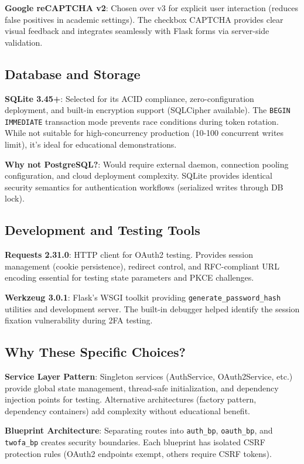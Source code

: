 \documentclass[12pt,a4paper]{article}
\begin{document}
\textbf{Google reCAPTCHA v2}: Chosen over v3 for explicit user interaction (reduces false positives in academic settings). The checkbox CAPTCHA provides clear visual feedback and integrates seamlessly with Flask forms via server-side validation.

\subsection{Database and Storage}

\textbf{SQLite 3.45+}: Selected for its ACID compliance, zero-configuration deployment, and built-in encryption support (SQLCipher available). The \texttt{BEGIN IMMEDIATE} transaction mode prevents race conditions during token rotation. While not suitable for high-concurrency production (10-100 concurrent writes limit), it's ideal for educational demonstrations.

\textbf{Why not PostgreSQL?}: Would require external daemon, connection pooling configuration, and cloud deployment complexity. SQLite provides identical security semantics for authentication workflows (serialized writes through DB lock).

\subsection{Development and Testing Tools}

\textbf{Requests 2.31.0}: HTTP client for OAuth2 testing. Provides session management (cookie persistence), redirect control, and RFC-compliant URL encoding essential for testing state parameters and PKCE challenges.

\textbf{Werkzeug 3.0.1}: Flask's WSGI toolkit providing \texttt{generate\_password\_hash} utilities and development server. The built-in debugger helped identify the session fixation vulnerability during 2FA testing.

\subsection{Why These Specific Choices?}

\textbf{Service Layer Pattern}: Singleton services (AuthService, OAuth2Service, etc.) provide global state management, thread-safe initialization, and dependency injection points for testing. Alternative architectures (factory pattern, dependency containers) add complexity without educational benefit.

\textbf{Blueprint Architecture}: Separating routes into \texttt{auth\_bp}, \texttt{oauth\_bp}, and \texttt{twofa\_bp} creates security boundaries. Each blueprint has isolated CSRF protection rules (OAuth2 endpoints exempt, others require CSRF tokens).
\end{document}
